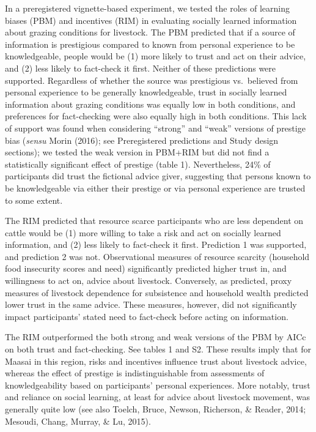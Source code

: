 \documentclass[
  11pt,
]{article}
\begin{document}
In a preregistered vignette-based experiment, we tested the roles of
learning biases (PBM) and incentives (RIM) in evaluating socially
learned information about grazing conditions for livestock. The PBM
predicted that if a source of information is prestigious compared to
known from personal experience to be knowledgeable, people would be (1)
more likely to trust and act on their advice, and (2) less likely to
fact-check it first. Neither of these predictions were supported.
Regardless of whether the source was prestigious vs.~believed from
personal experience to be generally knowledgeable, trust in socially
learned information about grazing conditions was equally low in both
conditions, and preferences for fact-checking were also equally high in
both conditions. This lack of support was found when considering
``strong'' and ``weak'' versions of prestige bias (\emph{sensu} Morin
(2016); see Preregistered predictions and Study design sections); we
tested the weak version in PBM+RIM but did not find a statistically
significant effect of prestige (table 1). Nevertheless, 24\% of
participants did trust the fictional advice giver, suggesting that
persons known to be knowledgeable via either their prestige or via
personal experience are trusted to some extent.

The RIM predicted that resource scarce participants who are less
dependent on cattle would be (1) more willing to take a risk and act on
socially learned information, and (2) less likely to fact-check it
first. Prediction 1 was supported, and prediction 2 was not.
Observational measures of resource scarcity (household food insecurity
scores and need) significantly predicted higher trust in, and
willingness to act on, advice about livestock. Conversely, as predicted,
proxy measures of livestock dependence for subsistence and household
wealth predicted lower trust in the same advice. These measures,
however, did not significantly impact participants' stated need to
fact-check before acting on information.

The RIM outperformed the both strong and weak versions of the PBM by
AICc on both trust and fact-checking. See tables 1 and S2. These results
imply that for Maasai in this region, risks and incentives influence
trust about livestock advice, whereas the effect of prestige is
indistinguishable from assessments of knowledgeability based on
participants' personal experiences. More notably, trust and reliance on
social learning, at least for advice about livestock movement, was
generally quite low (see also Toelch, Bruce, Newson, Richerson, \&
Reader, 2014; Mesoudi, Chang, Murray, \& Lu, 2015).
\end{document}
